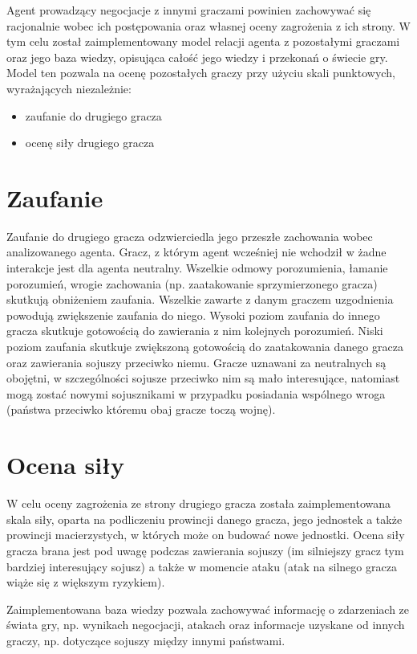 Agent prowadzący negocjacje z innymi graczami powinien zachowywać się racjonalnie wobec ich postępowania oraz własnej oceny zagrożenia z ich strony. W tym celu został zaimplementowany model relacji agenta z pozostałymi graczami oraz jego baza wiedzy, opisująca całość jego wiedzy i przekonań o świecie gry. Model ten pozwala na ocenę pozostałych graczy przy użyciu skali punktowych, wyrażających niezależnie:
\begin{itemize}
	\item{zaufanie do drugiego gracza}
	\item{ocenę siły drugiego gracza}
\end{itemize}

\section{Zaufanie}
Zaufanie do drugiego gracza odzwierciedla jego przeszłe zachowania wobec analizowanego agenta. Gracz, z którym agent wcześniej nie wchodził w żadne interakcje jest dla agenta neutralny. Wszelkie odmowy porozumienia, łamanie porozumień, wrogie zachowania (np. zaatakowanie sprzymierzonego gracza) skutkują obniżeniem zaufania. Wszelkie zawarte z danym graczem uzgodnienia powodują zwiększenie zaufania do niego. Wysoki poziom zaufania do innego gracza skutkuje gotowością do zawierania z nim kolejnych porozumień. Niski poziom zaufania skutkuje zwiększoną gotowością do zaatakowania danego gracza oraz zawierania sojuszy przeciwko niemu. Gracze uznawani za neutralnych są obojętni, w szczególności sojusze przeciwko nim są mało interesujące, natomiast mogą zostać nowymi sojusznikami w przypadku posiadania wspólnego wroga (państwa przeciwko któremu obaj gracze toczą wojnę).

\section{Ocena siły}
W celu oceny zagrożenia ze strony drugiego gracza została zaimplementowana skala siły, oparta na podliczeniu prowincji danego gracza, jego jednostek a także prowincji macierzystych, w których może on budować nowe jednostki. Ocena siły gracza brana jest pod uwagę podczas zawierania sojuszy (im silniejszy gracz tym bardziej interesujący sojusz) a także w momencie ataku (atak na silnego gracza wiąże się z większym ryzykiem).

Zaimplementowana baza wiedzy pozwala zachowywać informację o zdarzeniach ze świata gry, np. wynikach negocjacji, atakach oraz informacje uzyskane od innych graczy, np. dotyczące sojuszy między innymi państwami.

